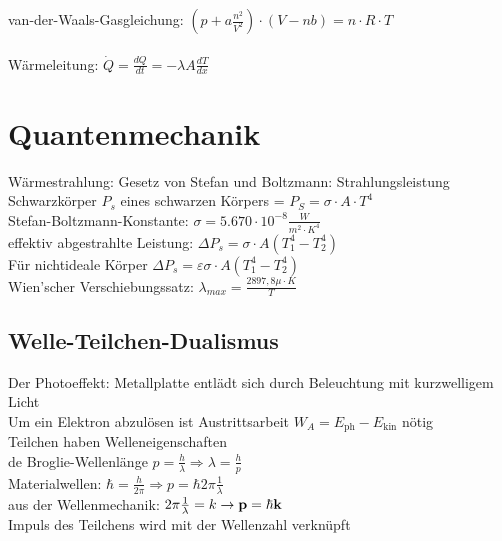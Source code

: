 \documentclass[fs, footer]{latex4ei}
\begin{document}
\begin{multicols*}{4}
van-der-Waals-Gasgleichung: $(p+a\frac{n^2}{V^2})\cdot(V-nb) = n\cdot R\cdot T$\\
\\
Wärmeleitung: $\dot Q = \frac{dQ}{dt} = - \lambda  A \frac{dT}{dx}$\\


\vspace{-8mm}
\section{Quantenmechanik}

Wärmestrahlung: Gesetz von Stefan und Boltzmann: 
Strahlungsleistung Schwarzkörper $P_s$ eines schwarzen Körpers = $ P_S = \sigma\cdot A\cdot T^4 $\\
Stefan-Boltzmann-Konstante: $\sigma = 5.670 \cdot 10^{-8}\frac{W}{m^2\cdot K^4}$\\
effektiv abgestrahlte Leistung: $\Delta P_s = \sigma\cdot A (T_1^4-T_2^4)$\\

Für nichtideale Körper $\Delta P_s = \varepsilon\sigma\cdot A (T_1^4-T_2^4)$\\
Wien'scher Verschiebungssatz: $\lambda_{max} = \frac{2897,8\mu\cdot K}{T}$\\

\subsection{Welle-Teilchen-Dualismus}
Der Photoeffekt: Metallplatte entlädt sich durch Beleuchtung mit kurzwelligem Licht\\
Um ein Elektron abzulösen ist Austrittsarbeit $W_A = E_{\text{ph}} - E_{\text{kin}}$ nötig\\

Teilchen haben Welleneigenschaften\\
de Broglie-Wellenlänge $p = \frac{h}{\lambda} \Rightarrow \lambda = \frac{h}{p}$\\
Materialwellen: $\hbar = \frac{h}{2\pi} \Rightarrow p = \hbar 2\pi \frac{1}{\lambda}$\\
aus der Wellenmechanik: $2\pi\frac{1}{\lambda} = k \rightarrow \textbf{p} = \hbar \textbf{k}$\\
Impuls des Teilchens wird mit der Wellenzahl verknüpft\\


\end{multicols*}
\end{document}
